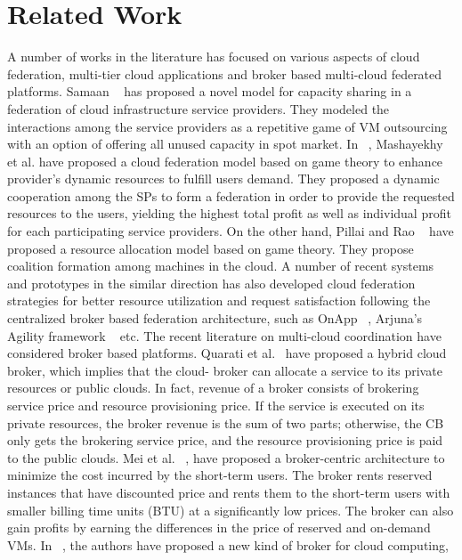 \documentclass[12pt,a4paper,twoside,openright]{report}
\newcommand\tab[1][0.8cm]{\hspace*{#1}}
\begin{document}
\chapter{Related Work}\label{ch:ch2}
\tab A number of works in the literature has focused on various
aspects of cloud federation, multi-tier cloud applications and
broker based multi-cloud federated platforms. Samaan ~\cite{b5} has
proposed a novel model for capacity sharing in a federation
of cloud infrastructure service providers. They modeled the
interactions among the service providers as a repetitive game
of VM outsourcing with an option of offering all unused
capacity in spot market. In ~\cite{b3}, Mashayekhy et al. have
proposed a cloud federation model based on game theory to
enhance provider’s dynamic resources to fulfill users demand.
They proposed a dynamic cooperation among the SPs to form
a federation in order to provide the requested resources to the
users, yielding the highest total profit as well as individual
profit for each participating service providers. On the other
hand, Pillai and Rao ~\cite{b6} have proposed a resource allocation
model based on game theory. They propose coalition formation
among machines in the cloud. A number of recent systems and
prototypes in the similar direction has also developed cloud
federation strategies for better resource utilization and request
satisfaction following the centralized broker based federation
architecture, such as OnApp ~\cite{b1}, Arjuna’s Agility framework
~\cite{b8} etc.
\newline
\tab The recent literature on multi-cloud coordination have
considered broker based platforms. Quarati et al.~\cite{b10} have
proposed a hybrid cloud broker, which implies that the cloud-
broker can allocate a service to its private resources or public
clouds. In fact, revenue of a broker consists of brokering
service price and resource provisioning price. If the service
is executed on its private resources, the broker revenue is the
sum of two parts; otherwise, the CB only gets the brokering
service price, and the resource provisioning price is paid to the
public clouds. Mei et al. ~\cite{b8}, have proposed a broker-centric
architecture to minimize the cost incurred by the short-term
users. The broker rents reserved instances that have discounted
price and rents them to the short-term users with smaller
billing time units (BTU) at a significantly low prices. The
broker can also gain profits by earning the differences in the
price of reserved and on-demand VMs. In ~\cite{b9}, the authors
have proposed a new kind of broker for cloud computing,
\end{document}
